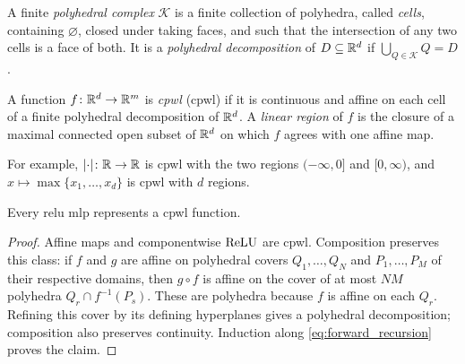 \begin{definition}\label{def:polyhedral_complex}
A finite \emph{polyhedral complex} $\mathcal K$ is a finite collection of polyhedra, called \emph{cells}, containing $\varnothing$, closed under taking faces, and such that the intersection of any two cells is a face of both. It is a \emph{polyhedral decomposition} of $D\subseteq\mathbb{R}^d$ if $\bigcup_{Q\in\mathcal K}Q=D$.
\end{definition}

\begin{definition}\label{def:cpwl}
A function $f \colon \mathbb{R}^{d} \to \mathbb{R}^{m}$ is \emph{\acl{cpwl}} (\acs{cpwl}) if it is continuous and affine on each cell of a finite polyhedral decomposition of $\mathbb{R}^d$. A \emph{linear region} of $f$ is the closure of a maximal connected open subset of $\mathbb{R}^d$ on which $f$ agrees with one affine map.
\end{definition}

For example, $\lvert\cdot\rvert \colon \mathbb{R} \to \mathbb{R}$ is \ac{cpwl} with the two regions $(-\infty, 0]$ and $[0, \infty)$, and $x \mapsto \max\{x_1, \ldots, x_d\}$ is \ac{cpwl} with $d$ regions.

\begin{observation}\label{obs:relu_is_cpwl}
Every \ac{relu} \ac{mlp} represents a \ac{cpwl} function.\end{observation}

\begin{proof}
Affine maps and componentwise $\text{ReLU}$ are \ac{cpwl}. Composition preserves this class: if $f$ and $g$ are affine on polyhedral covers $Q_1, \ldots, Q_N$ and $P_1, \ldots, P_M$ of their respective domains, then $g\circ f$ is affine on the cover of at most $NM$ polyhedra $Q_r\cap f^{-1}(P_s)$. These are polyhedra because $f$ is affine on each $Q_r$. Refining this cover by its defining hyperplanes gives a polyhedral decomposition; composition also preserves continuity. Induction along \eqref{eq:forward_recursion} proves the claim.
\end{proof}

